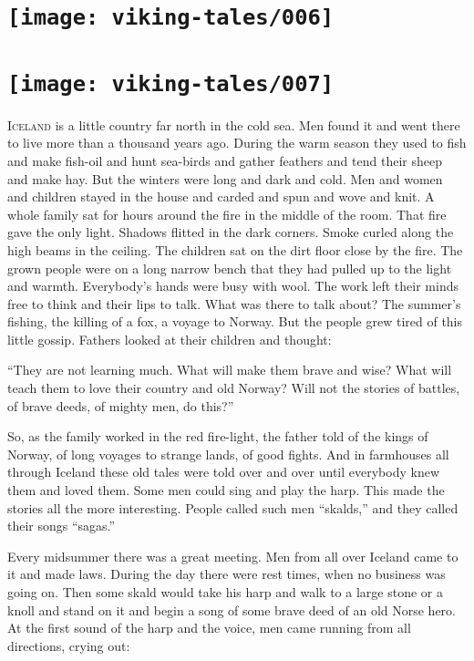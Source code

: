 \chapter[\itshape A List of the Illustrations]{\texttt{[image: viking-tales/006]}}
\listoffigures

\chapter[\itshape What the Sagas Were]{
    \texttt{[image: viking-tales/007]}}

\lettrine{I}{celand} is a little country far north in the cold sea. Men
found it and went there to live more than a thousand years ago. During
the warm season they used to fish and make fish-oil and hunt sea-birds
and gather feathers and tend their sheep and make hay. But the winters
were long and dark and cold. Men and women and children stayed in the
house and carded and spun and wove and knit. A whole family sat for hours
around the fire in the middle of the room. That fire gave the only light.
Shadows flitted in the dark corners. Smoke curled along the high beams
in the ceiling. The children sat on the dirt floor close by the fire.
The grown people were on a long narrow bench that they had pulled up to
the light and warmth. Everybody's hands were busy with wool. The work
left their minds free to think and their lips to talk. What was there to
talk about? The summer's fishing, the killing of a fox, a voyage to
Norway. But the people grew tired of this little gossip. Fathers looked
at their children and thought:

``They are not learning much. What will make them brave and wise? What
will teach them to love their country and old Norway? Will not the
stories of battles, of brave deeds, of mighty men, do this?''

So, as the family worked in the red fire-light, the father told of the
kings of Norway, of long voyages to strange lands, of good fights. And
in farmhouses all through Iceland these old tales were told over and
over until everybody knew them and loved them. Some men could sing and
play the harp. This made the stories all the more interesting. People
called such men ``skalds,'' and they called their songs ``sagas.''

Every midsummer there was a great meeting. Men from all over Iceland
came to it and made laws. During the day there were rest times, when no
business was going on. Then some skald would take his harp and walk to a
large stone or a knoll and stand on it and begin a song of some brave
deed of an old Norse hero. At the first sound of the harp and the voice,
men came running from all directions, crying out:

